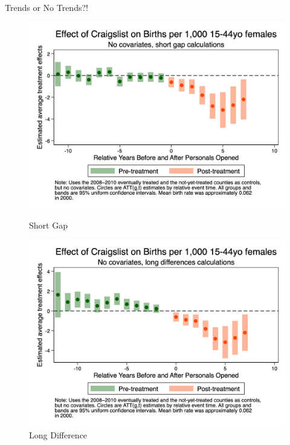 \documentclass{beamer}
\begin{document}
\begin{frame}{Trends or No Trends?!}

\begin{figure}[htbp]
    \centering
    \begin{minipage}[b]{0.48\textwidth}
        \centering
    \includegraphics[height=0.45\textheight]{./lecture_includes/es_births_shortnone.png}
        \caption{Short Gap}
    \end{minipage}
    \hfill
    \begin{minipage}[b]{0.48\textwidth}
        \centering
    \includegraphics[height=0.45\textheight]{./lecture_includes/es_births_none}
        \caption{Long Difference}
    \end{minipage}
\end{figure}

\end{frame}
\end{document}
